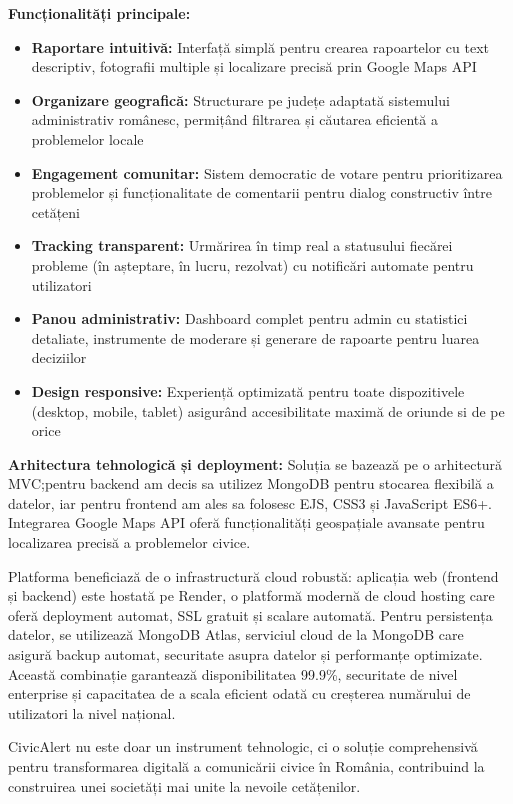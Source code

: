 \documentclass[12pt,a4paper]{report}
\begin{document}
\textbf{Funcționalități principale:}
\begin{itemize}
\item \textbf{Raportare intuitivă:} Interfață simplă pentru crearea rapoartelor cu text descriptiv, fotografii multiple și localizare precisă prin Google Maps API
\item \textbf{Organizare geografică:} Structurare pe județe adaptată sistemului administrativ românesc, permițând filtrarea și căutarea eficientă a problemelor locale
\item \textbf{Engagement comunitar:} Sistem democratic de votare pentru prioritizarea problemelor și funcționalitate de comentarii pentru dialog constructiv între cetățeni
\item \textbf{Tracking transparent:} Urmărirea în timp real a statusului fiecărei probleme (în așteptare, în lucru, rezolvat) cu notificări automate pentru utilizatori
\item \textbf{Panou administrativ:} Dashboard complet pentru admin cu statistici detaliate, instrumente de moderare și generare de rapoarte pentru luarea deciziilor
\item \textbf{Design responsive:} Experiență optimizată pentru toate dispozitivele (desktop, mobile, tablet) asigurând accesibilitate maximă de oriunde si de pe orice
\end{itemize}

\textbf{Arhitectura tehnologică și deployment:}
Soluția se bazează pe o arhitectură MVC;pentru backend am decis sa utilizez MongoDB pentru stocarea flexibilă a datelor, iar pentru frontend am ales sa folosesc  EJS, CSS3 și JavaScript ES6+. Integrarea Google Maps API oferă funcționalități geospațiale avansate pentru localizarea precisă a problemelor civice.

Platforma beneficiază de o infrastructură cloud robustă: aplicația web (frontend și backend) este hostată pe Render, o platformă modernă de cloud hosting care oferă deployment automat, SSL gratuit și scalare automată. Pentru persistența datelor, se utilizează MongoDB Atlas, serviciul cloud de la MongoDB care asigură backup automat, securitate asupra datelor și performanțe optimizate. Această combinație garantează disponibilitatea 99.9\%, securitate de nivel enterprise și capacitatea de a scala eficient odată cu creșterea numărului de utilizatori la nivel național.

CivicAlert nu este doar un instrument tehnologic, ci o soluție comprehensivă pentru transformarea digitală a comunicării civice în România, contribuind la construirea unei societăți mai unite la nevoile cetățenilor.
\end{document}
